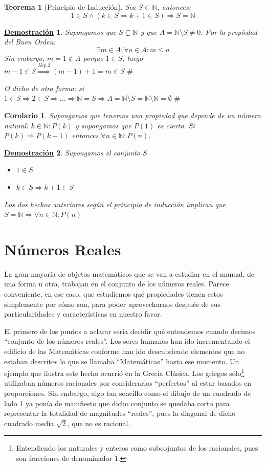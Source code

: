 \documentclass[10pt,a4paper,openright]{book}
\theoremstyle{break}
\newtheorem{theo}{Teorema}[chapter]
\newtheorem{coro}{Corolario}[theo]
\newtheorem*{demo}{\underline{Demostración}}
\begin{document}
\begin{theo}[Principio de Inducción]
Sea $S\subset \mathbb N$, entonces:
$$1\in S\wedge (k\in S\Rightarrow k+1\in S)\Rightarrow S=\mathbb N$$
\end{theo}
\begin{demo}
Supongamos que $S\subsetneq \mathbb N$ y que $A=\mathbb N\mbox{\textbackslash} S\neq 0$. Por la propiedad del Buen Orden:
$$\exists m \in A : \forall a \in A: m\leq a$$
Sin embargo, $m=1\notin A$ porque $1\in S$, luego $m-1\in S\stackrel{Hip. 2}{\Rightarrow} (m-1)+1=m\in S \mbox{ \#}$\par
O dicho de otra forma: si $1\in S\Rightarrow 2\in S \Rightarrow ... \Rightarrow \mathbb N=S\Rightarrow A=\mathbb N \mbox{\textbackslash} S=\mathbb N \mbox{\textbackslash} \mathbb N=\emptyset \mbox{ \#}$
\end{demo}

\begin{coro}
Supongamos que tenemos una propiedad que depende de un número natural: $k \in \mathbb N : P(k)$ y supongamos que $P(1)$ es cierto. Si $P(k)\Rightarrow P(k+1)$ entonces $\forall n \in \mathbb N : P(n)$.
\end{coro}
\begin{demo}
Supongamos el conjunto $S$
\begin{itemize}
\item $1\in S$
\item $k\in S\Rightarrow k+1\in S$
\end{itemize}
Los dos hechos anteriores según el principio de inducción implican que $S=\mathbb N\Rightarrow \forall n \in \mathbb N : P(n)$
\end{demo}

\chapter{Números Reales}
La gran mayoría de objetos matemáticos que se van a estudiar en el manual, de una forma u otra, trabajan en el conjunto de los números reales. Parece conveniente, en ese caso, que estudiemos qué propiedades tienen estos simplemente por cómo son, para poder aprovecharnos después de sus particularidades y características en nuestro favor.

El primero de los puntos a aclarar sería decidir qué entendemos cuando decimos ``conjunto de los números reales''. Los seres humanos han ido incrementando el edificio de las Matemáticas conforme han ido descubriendo elementos que no estaban descritos lo que se llamaba ``Matemáticas'' hasta ese momento. Un ejemplo que ilustra este hecho ocurrió en la Grecia Clásica. Los griegos sólo\footnote{Entendiendo los naturales y enteros como subcojuntos de los racionales, pues son fracciones de denominador 1.} utilizaban números racionales por considerarlos ``perfectos'' al estar basados en proporciones. Sin embargo, algo tan sencillo como el dibujo de un cuadrado de lado 1 ya ponía de manifiesto que dicho conjunto se quedaba corto para representar la totalidad de magnitudes ``reales'', pues la diagonal de dicho cuadrado medía $\sqrt{2}$, que no es racional.
\end{document}

